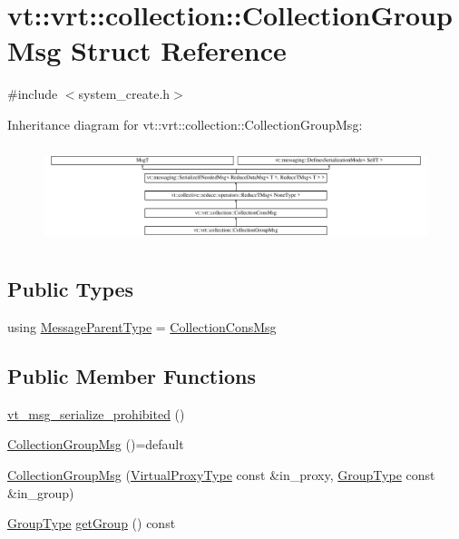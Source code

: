 \hypertarget{structvt_1_1vrt_1_1collection_1_1_collection_group_msg}{}\section{vt\+:\+:vrt\+:\+:collection\+:\+:Collection\+Group\+Msg Struct Reference}
\label{structvt_1_1vrt_1_1collection_1_1_collection_group_msg}


{\ttfamily \#include $<$system\+\_\+create.\+h$>$}

Inheritance diagram for vt\+:\+:vrt\+:\+:collection\+:\+:Collection\+Group\+Msg\+:\begin{figure}[H]
\begin{center}
\leavevmode
\includegraphics[height=2.874743cm]{structvt_1_1vrt_1_1collection_1_1_collection_group_msg}
\end{center}
\end{figure}
\subsection*{Public Types}
\begin{DoxyCompactItemize}
\item 
using \hyperlink{structvt_1_1vrt_1_1collection_1_1_collection_group_msg_a4468c3f74ebd21257bfbb35222ac1fa4}{Message\+Parent\+Type} = \hyperlink{structvt_1_1vrt_1_1collection_1_1_collection_cons_msg}{Collection\+Cons\+Msg}
\end{DoxyCompactItemize}
\subsection*{Public Member Functions}
\begin{DoxyCompactItemize}
\item 
\hyperlink{structvt_1_1vrt_1_1collection_1_1_collection_group_msg_ae4d92c74c6899563aada25b9d5ffad06}{vt\+\_\+msg\+\_\+serialize\+\_\+prohibited} ()
\item 
\hyperlink{structvt_1_1vrt_1_1collection_1_1_collection_group_msg_a3b5c4da131f779c814ede149ec3fbb81}{Collection\+Group\+Msg} ()=default
\item 
\hyperlink{structvt_1_1vrt_1_1collection_1_1_collection_group_msg_abae6c35e09794b3c43c7b6c39f489196}{Collection\+Group\+Msg} (\hyperlink{namespacevt_a1b417dd5d684f045bb58a0ede70045ac}{Virtual\+Proxy\+Type} const \&in\+\_\+proxy, \hyperlink{namespacevt_a27b5e4411c9b6140c49100e050e2f743}{Group\+Type} const \&in\+\_\+group)
\item 
\hyperlink{namespacevt_a27b5e4411c9b6140c49100e050e2f743}{Group\+Type} \hyperlink{structvt_1_1vrt_1_1collection_1_1_collection_group_msg_a109efca9965d4d4353d6b0a317297600}{get\+Group} () const
\end{DoxyCompactItemize}
